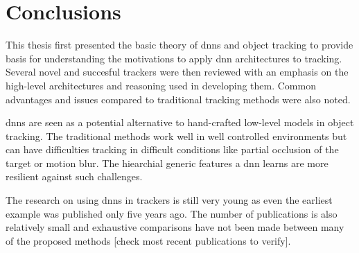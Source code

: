 \section{Conclusions}

This thesis first presented the basic theory of \ac{dnn}s and object tracking to
provide basis for understanding the motivations to apply \ac{dnn} architectures
to tracking. Several novel and succesful trackers were then reviewed with an emphasis
on the high-level architectures and reasoning used in developing them. Common advantages
and issues compared to traditional tracking methods were also noted.

\ac{dnn}s are seen as a potential alternative to hand-crafted low-level models in
object tracking. The traditional methods work well in well controlled environments
but can have difficulties tracking in difficult conditions like partial occlusion
of the target or motion blur. The hiearchial generic features a \ac{dnn} learns
are more resilient against such challenges.

The research on using \ac{dnn}s in trackers is still very young as even the earliest
example was published only five years ago. The number of publications is also relatively
small and exhaustive comparisons have not been made between many of the proposed
methods [check most recent publications to verify].